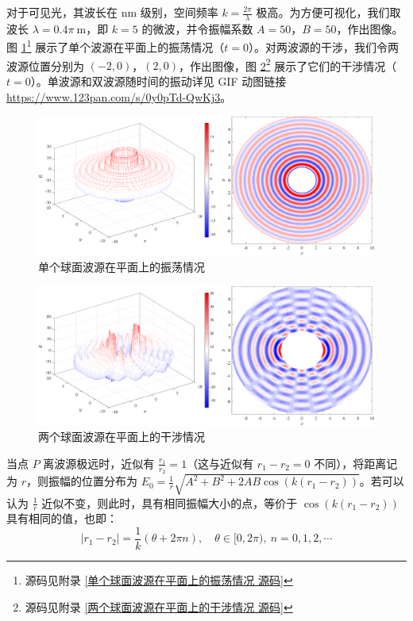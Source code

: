 \documentclass[UTF8]{report}
\theoremstyle{MyLineTheoremStyle} %
\theoremstyle{MyBlockTheoremStyle} %
\theoremstyle{MySubsubsectionStyle} %
\begin{document}
对于可见光，其波长在 nm 级别，空间频率 $k = \frac{2\pi}{\lambda}$ 极高。为方便可视化，我们取波长 $\lambda = 0.4 \pi \ \mathrm{m}$，即 $k = 5$ 的微波，并令振幅系数 $A = 50$，$B = 50$，作出图像。图 \ref{单个球面波源在平面上的振荡情况}\footnote{源码见附录 \ref{单个球面波源在平面上的振荡情况 源码}} 展示了单个波源在平面上的振荡情况（$t = 0$）。对两波源的干涉，我们令两波源位置分别为 $(-2, 0)$，$(2, 0)$，作出图像，图 \ref{两个球面波源在平面上的干涉情况}\footnote{源码见附录 \ref{两个球面波源在平面上的干涉情况 源码}} 展示了它们的干涉情况（$t = 0$）。单波源和双波源随时间的振动详见 GIF 动图链接 \href{https://www.123pan.com/s/0y0pTd-QwKj3}{https://www.123pan.com/s/0y0pTd-QwKj3}。

\begin{figure}[H]\centering
\includegraphics[width=0.95\columnwidth]{assets/3/单个球面波源.pdf}
\caption{ 单个球面波源在平面上的振荡情况}\label{单个球面波源在平面上的振荡情况}
\end{figure}

\begin{figure}[H]\centering
\includegraphics[width=0.95\columnwidth]{assets/3/两个球面波源.pdf}
\caption{ 两个球面波源在平面上的干涉情况}\label{两个球面波源在平面上的干涉情况}
\end{figure}

当点 $P$ 离波源极远时，近似有 $\frac{r_1}{r_2} = 1$（这与近似有 $r_1 - r_2 = 0$ 不同），将距离记为 $r$，则振幅的位置分布为 $E_0 = \frac{1}{r} \sqrt{ A^2 + B^2 + 2AB \cos (k(r_1 - r_2))} $。若可以认为 $\frac{1}{r}$ 近似不变，则此时，具有相同振幅大小的点，等价于 $\cos (k(r_1 - r_2))$ 具有相同的值，也即：
\begin{equation}
    | r_1 -  r_2| =  \frac{1}{k} (\theta + 2\pi n),\quad \theta \in [0, 2\pi),\  n = 0,1,2,\cdots
\end{equation}
\end{document}

